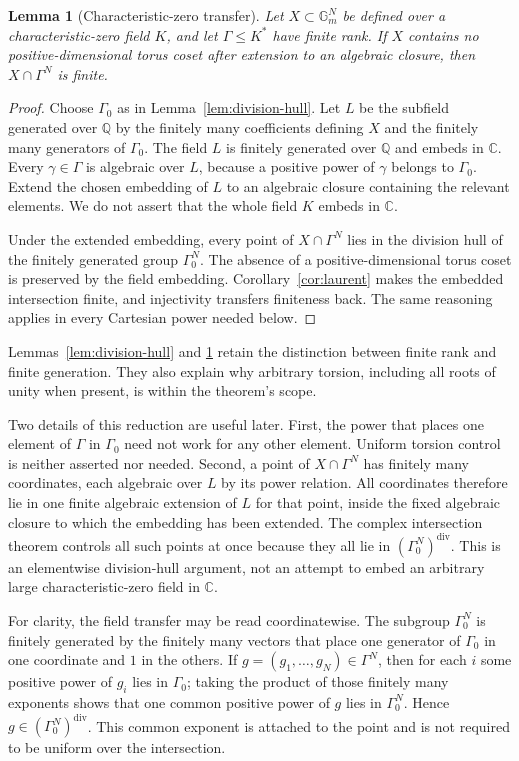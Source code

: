 \documentclass[11pt]{article}
\newtheorem{lemma}[theorem]{Lemma}
\theoremstyle{definition}
\theoremstyle{remark}
\newcommand{\Gm}{\mathbb{G}_{m}}
\newcommand{\Q}{\mathbb{Q}}
\newcommand{\C}{\mathbb{C}}
\newcommand{\Gam}{\Gamma}
\newcommand{\divh}{\mathrm{div}}
\begin{document}
\begin{lemma}[Characteristic-zero transfer]
\label{lem:field-transfer}
Let $X\subset\Gm^N$ be defined over a characteristic-zero field $K$, and let
$\Gam\leq K^*$ have finite rank.  If $X$ contains no positive-dimensional torus coset after extension to an algebraic closure, then
$X\cap\Gam^N$ is finite.
\end{lemma}

\begin{proof}
Choose $\Gam_0$ as in Lemma~\ref{lem:division-hull}.  Let $L$ be the subfield generated over $\Q$ by the finitely many coefficients defining $X$ and the finitely many generators of $\Gam_0$.  The field $L$ is finitely generated over $\Q$ and embeds in $\C$.  Every $\gamma\in\Gam$ is algebraic over $L$, because a positive power of $\gamma$ belongs to $\Gam_0$.  Extend the chosen embedding of $L$ to an algebraic closure containing the relevant elements.  We do not assert that the whole field $K$ embeds in $\C$.

Under the extended embedding, every point of $X\cap\Gam^N$ lies in the division hull of the finitely generated group $\Gam_0^N$.  The absence of a positive-dimensional torus coset is preserved by the field embedding.  Corollary~\ref{cor:laurent} makes the embedded intersection finite, and injectivity transfers finiteness back.  The same reasoning applies in every Cartesian power needed below.
\end{proof}

Lemmas~\ref{lem:division-hull} and \ref{lem:field-transfer} retain the distinction between finite rank and finite generation.  They also explain why arbitrary torsion, including all roots of unity when present, is within the theorem's scope.

Two details of this reduction are useful later.  First, the power that places
one element of $\Gam$ in $\Gam_0$ need not work for any other element.
Uniform torsion control is neither asserted nor needed.  Second, a point of
$X\cap\Gam^N$ has finitely many coordinates, each algebraic over $L$ by its
power relation.  All coordinates therefore lie in one finite algebraic
extension of $L$ for that point, inside the fixed algebraic closure to which
the embedding has been extended.  The complex intersection theorem controls
all such points at once because they all lie in
$(\Gam_0^N)^{\divh}$.  This is an elementwise division-hull argument, not an
attempt to embed an arbitrary large characteristic-zero field in $\C$.

For clarity, the field transfer may be read coordinatewise.  The subgroup
$\Gam_0^N$ is finitely generated by the finitely many vectors that place one
generator of $\Gam_0$ in one coordinate and $1$ in the others.  If
$g=(g_1,\ldots,g_N)\in\Gam^N$, then for each $i$ some positive power of
$g_i$ lies in $\Gam_0$; taking the product of those finitely many exponents
shows that one common positive power of $g$ lies in $\Gam_0^N$.  Hence
$g\in(\Gam_0^N)^{\divh}$.  This common exponent is attached to the point and
is not required to be uniform over the intersection.
\end{document}
